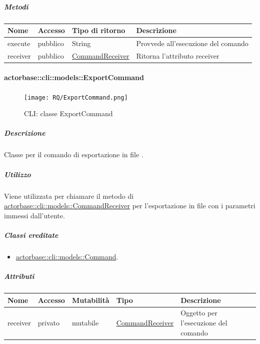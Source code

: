 \documentclass{scalatekids-article}
\begin{document}
\subparagraph{Metodi}

\begin{tabular}{| p{3cm} | p{1.5cm} | p{3.5cm} | p{9cm} |}
  \hline
  Nome & Accesso & Tipo di ritorno & Descrizione\\
  \hline
  execute & pubblico & String & Provvede all'esecuzione del comando\\
  \hline
  receiver & pubblico & \hyperref[sec:actorbase::cli::models::CommandReceiver]{CommandReceiver} & Ritorna l'attributo receiver\\
  \hline
\end{tabular}

\paragraph{actorbase::cli::models::ExportCommand}
\label{sec:actorbase::cli::models::ExportCommand}

\begin{figure}[H]
  \begin{center}
    \texttt{[image: RQ/ExportCommand.png]}
    \caption{CLI: classe ExportCommand}
  \end{center}
\end{figure}

\subparagraph{Descrizione}

Classe per il comando di esportazione in file .

\subparagraph{Utilizzo}

Viene utilizzata per chiamare il metodo di
\hyperref[sec:actorbase::cli::models::CommandReceiver]{actorbase::cli::models::CommandReceiver} per l'esportazione in file
 con i parametri immessi dall'utente.

\subparagraph{Classi ereditate}

\begin{itemize}
\item \hyperref[sec:actorbase::cli::models::Command]{actorbase::cli::models::Command}.
\end{itemize}

\subparagraph{Attributi}

\begin{tabular}{| p{1cm} | p{1.5cm} | p{2cm} | p{4cm} | p{8.5cm} |}
  \hline
  Nome & Accesso & Mutabilità & Tipo & Descrizione\\
  \hline
  receiver & privato & mutabile & \hyperref[sec:actorbase::cli::models::CommandReceiver]{CommandReceiver} & Oggetto per l'esecuzione del comando\\
  \hline
\end{tabular}
\end{document}
